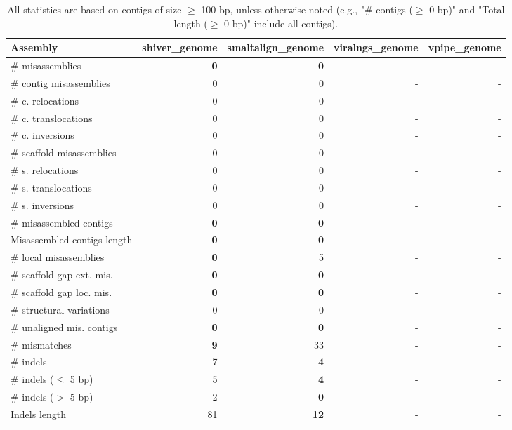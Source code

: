 \documentclass[12pt,a4paper]{article}
\begin{document}
\begin{table}[ht]
\begin{center}
\caption{All statistics are based on contigs of size $\geq$ 100 bp, unless otherwise noted (e.g., "\# contigs ($\geq$ 0 bp)" and "Total length ($\geq$ 0 bp)" include all contigs).}
\begin{tabular}{|l*{4}{|r}|}
\hline
Assembly & shiver\_genome & smaltalign\_genome & viralngs\_genome & vpipe\_genome \\ \hline
\# misassemblies & {\bf 0} & {\bf 0} & - & - \\ \hline
\hspace{2mm}\# contig misassemblies & 0 & 0 & - & - \\ \hline
\hspace{5mm}\# c. relocations & 0 & 0 & - & - \\ \hline
\hspace{5mm}\# c. translocations & 0 & 0 & - & - \\ \hline
\hspace{5mm}\# c. inversions & 0 & 0 & - & - \\ \hline
\hspace{2mm}\# scaffold misassemblies & 0 & 0 & - & - \\ \hline
\hspace{5mm}\# s. relocations & 0 & 0 & - & - \\ \hline
\hspace{5mm}\# s. translocations & 0 & 0 & - & - \\ \hline
\hspace{5mm}\# s. inversions & 0 & 0 & - & - \\ \hline
\# misassembled contigs & {\bf 0} & {\bf 0} & - & - \\ \hline
Misassembled contigs length & {\bf 0} & {\bf 0} & - & - \\ \hline
\# local misassemblies & {\bf 0} & 5 & - & - \\ \hline
\# scaffold gap ext. mis. & {\bf 0} & {\bf 0} & - & - \\ \hline
\# scaffold gap loc. mis. & {\bf 0} & {\bf 0} & - & - \\ \hline
\# structural variations & 0 & 0 & - & - \\ \hline
\# unaligned mis. contigs & {\bf 0} & {\bf 0} & - & - \\ \hline
\# mismatches & {\bf 9} & 33 & - & - \\ \hline
\# indels & 7 & {\bf 4} & - & - \\ \hline
\hspace{5mm}\# indels ($\leq$ 5 bp) & 5 & {\bf 4} & - & - \\ \hline
\hspace{5mm}\# indels ($>$ 5 bp) & 2 & {\bf 0} & - & - \\ \hline
Indels length & 81 & {\bf 12} & - & - \\ \hline
\end{tabular}
\end{center}
\end{table}
\end{document}
